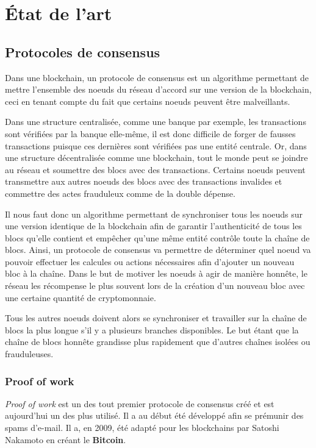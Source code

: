\chapter{État de l'art}
\label{ch:etat_art}

\section{Protocoles de consensus}

Dans une blockchain, un protocole de consensus est un algorithme permettant de mettre l'ensemble des noeuds du réseau d'accord sur une version de la blockchain, ceci en tenant compte du fait que certains noeuds peuvent être malveillants.

Dans une structure centralisée, comme une banque par exemple, les transactions sont vérifiées par la banque elle-même, il est donc difficile de forger de fausses transactions puisque ces dernières sont vérifiées pas une entité centrale. Or, dans une structure décentralisée comme une blockchain, tout le monde peut se joindre au réseau et soumettre des blocs avec des transactions. Certains noeuds peuvent transmettre aux autres noeuds des blocs avec des transactions invalides et commettre des actes frauduleux comme de la double dépense.

Il nous faut donc un algorithme permettant de synchroniser tous les noeuds sur une version identique de la blockchain afin de garantir l'authenticité de tous les blocs qu'elle contient et empêcher qu'une même entité contrôle toute la chaîne de blocs. Ainsi, un protocole de consensus va permettre de déterminer quel noeud va pouvoir effectuer les calcules ou actions nécessaires afin d'ajouter un nouveau bloc à la chaîne. Dans le but de motiver les noeuds à agir de manière honnête, le réseau les récompense le plus souvent lors de la création d'un nouveau bloc avec une certaine quantité de cryptomonnaie. 

Tous les autres noeuds doivent alors se synchroniser et travailler sur la chaîne de blocs la plus longue s'il y a plusieurs branches disponibles. Le but étant que la chaîne de blocs honnête grandisse plus rapidement que d'autres chaînes isolées ou frauduleuses.

\subsection{Proof of work}
\label{consensus:pow}

\textit{Proof of work} est un des tout premier protocole de consensus créé et est aujourd'hui un des plus utilisé. Il a au début été développé afin se prémunir des spams d'e-mail. Il a, en 2009, été adapté pour les blockchains par Satoshi Nakamoto en créant le \textbf{Bitcoin}.

